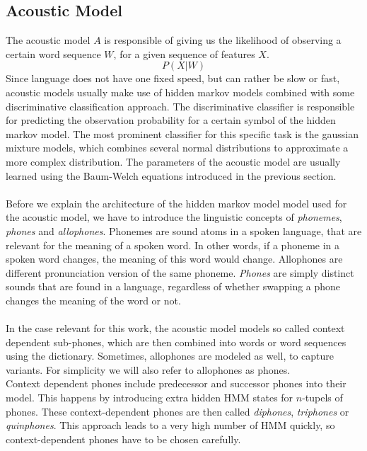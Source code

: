 
\subsection{Acoustic Model}
\label{sec:acoustic_model}
The acoustic model $A$ is responsible of giving us the likelihood of observing a certain word sequence $W$, for a given sequence of features $X$. 
\[
	P(X|W)
\]
Since language does not have one fixed speed, but can rather be slow or fast, acoustic models usually make use of hidden markov models combined with some discriminative classification approach. The discriminative classifier is responsible for predicting the observation probability for a certain symbol of the hidden markov model. The most prominent classifier for this specific task is the gaussian mixture models, which combines several normal distributions to approximate a more complex distribution. The parameters of the acoustic model are usually learned using the Baum-Welch equations introduced in the previous section. \\ \\
Before we explain the architecture of the hidden markov model model used for the acoustic model, we have to introduce the linguistic concepts of \textit{phonemes}, \textit{phones} and \textit{allophones}. Phonemes are sound atoms in a spoken language, that are relevant for the meaning of a spoken word. In other words, if a phoneme in a spoken word changes, the meaning of this word would change. Allophones are different pronunciation version of the same phoneme. \textit{Phones} are simply distinct sounds that are found in a language, regardless of whether swapping a phone changes the meaning of the word or not. \\ \\
In the case relevant for this work, the acoustic model models so called context dependent sub-phones, which are then combined into words or word sequences using the dictionary. Sometimes, allophones are modeled as well, to capture variants. For simplicity we will also refer to allophones as phones. \\
Context dependent phones include predecessor and successor phones into their model. This happens by introducing extra hidden HMM states for $n$-tupels of phones. These context-dependent phones are then called \textit{diphones}, \textit{triphones} or \textit{quinphones}. This approach leads to a very high number of HMM quickly, so context-dependent phones have to be chosen carefully. \\
